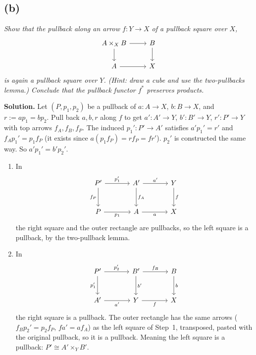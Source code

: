 \documentclass[11pt]{article}
\begin{document}
\pagebreak

\subsection*{(b)}

\textit{Show that the pullback along an arrow $f: Y \rightarrow X$ of a
pullback square over $X$,}
\[
  \begin{tikzcd}
    A \times_{X} B \ar[r] \ar[d] & B \ar[d] \\
    A \ar[r] & X
  \end{tikzcd}
\]
\textit{is again a pullback square over $Y$. (Hint: draw a cube and use the
two-pullbacks lemma.) Conclude that the pullback functor $f^{*}$ preserves
products.}

\medskip

\textbf{Solution.} Let $(P,p_1,p_2)$ be a pullback of $a : A \to X$, $b : B \to
X$, and $r := a p_1 = b p_2$. Pull back $a, b, r$ along $f$ to get $a' : A' \to
Y$, $b' : B' \to Y$, $r' : P' \to Y$ with top arrows $f_A, f_B, f_P$. The
induced $p_1' : P' \to A'$ satisfies $a' p_1' = r'$ and $f_A p_1' = p_1 f_P$
(it exists since $a(p_1 f_P) = r f_P = f r'$). $p_2'$ is constructed the same
way. So $a' p_1' = b' p_2'$.

\begin{enumerate}
  \item In
    \[
      \begin{tikzcd}[sep=large]
        P' \ar[r, "p_1'"] \ar[d, "f_P"'] & A' \ar[r, "a'"] \ar[d, "f_A"] & Y \ar[d, "f"] \\
        P \ar[r, "p_1"'] & A \ar[r, "a"'] & X
      \end{tikzcd}
    \]
    the right square and the outer rectangle are pullbacks, so the left square
    is a pullback, by the two-pullback lemma.
  \item In
    \[
      \begin{tikzcd}[sep=large]
        P' \ar[r, "p_2'"] \ar[d, "p_1'"'] & B' \ar[r, "f_B"] \ar[d, "b'"] & B \ar[d, "b"] \\
        A' \ar[r, "a'"'] & Y \ar[r, "f"'] & X
      \end{tikzcd}
    \]
    the right square is a pullback. The outer rectangle has the same arrows
    ($f_B p_2' = p_2 f_P$, $f a' = a f_A$) as the left square of Step~1,
    transposed, pasted with the original pullback, so it is a pullback. Meaning
    the left square is a pullback: $P' \cong A' \times_Y B'$.
\end{enumerate}
\end{document}
